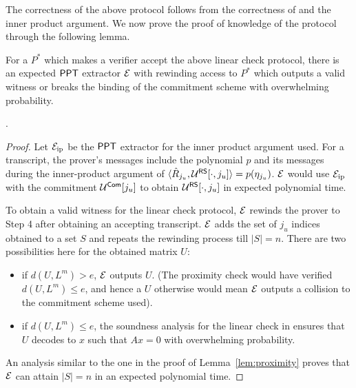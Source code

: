 The correctness of the above protocol follows from the correctness of \cite{Ligero} and the inner product argument. We now prove the proof of knowledge of the protocol through the following lemma.
\begin{lemma}
For a $P^*$ which makes a verifier accept the above linear check protocol, there is an expected $\mathsf{PPT}$ extractor $\mathcal{E}$ with rewinding access to $P^*$ which outputs a valid witness or breaks the binding of the commitment scheme with overwhelming probability.
\end{lemma}
.
\begin{proof}
Let $\mathcal{E}_{\mathrm{ip}}$ be the $\mathsf{PPT}$ extractor for the inner product argument used. For a transcript, the prover's messages include the polynomial $p$ and its messages during the inner-product argument of $\langle \hat{R}_{j_u},\mathcal{U}^{\mathsf{RS}}[\cdot,j_u]\rangle = p(\eta_{j_u})$.
$\mathcal{E}$ would use $\mathcal{E}_{\mathrm{ip}}$ with the commitment $\mathcal{U}^{\mathsf{Com}}[j_u]$ to obtain $\mathcal{U}^{\mathsf{RS}}[\cdot,j_u]$ in expected polynomial time. 

To obtain a valid witness for the linear check protocol, $\mathcal{E}$ rewinds the prover to Step 4 after obtaining an accepting transcript. $\mathcal{E}$ adds the set of $j_u$ indices obtained to a set $S$ and repeats the rewinding process till $|S| = n$. 
There are two possibilities here for the obtained matrix $U$:
\begin{itemize}
\item if $d(U, L^m) > e$, $\mathcal{E}$ outputs $U$. (The proximity check would have verified $d(U,L^m) \leq e$, and hence a $U$ otherwise would mean $\mathcal{E}$ outputs a collision to the commitment scheme used).
\item if $d(U, L^m) \leq e$, the soundness analysis for the linear check in \cite{Ligero} ensures that $U$ decodes to $x$ such that $Ax=0$ with overwhelming probability. %
\end{itemize}
An analysis similar to the one in the proof of Lemma~\ref{lem:proximity} proves that $\mathcal{E}$ can attain $|S| = n$ in an expected polynomial time.


\end{proof}
